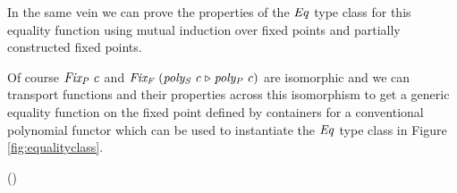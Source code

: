 In the same vein we can prove the properties of the \ensuremath{\Conid{Eq}} type class
for this equality function using mutual induction over fixed points
and partially constructed fixed points.

Of course \ensuremath{\Varid{Fix_{P}}\;\Varid{c}} and \ensuremath{\Varid{Fix_{F}}\;(\Varid{poly_{S}}\;\Varid{c}{\;\triangleright\;}\Varid{poly_{P}}\;\Varid{c})} are isomorphic and
we can transport functions and their properties across this
isomorphism to get a generic equality function on the fixed point
defined by containers for a conventional polynomial functor which can
be used to instantiate the \ensuremath{\Conid{Eq}} type class in Figure
\ref{fig:equalityclass}.
\begin{hscode}\SaveRestoreHook
{}%
%
%
\>[3]{}\;\;\Rightarrow {}\;(\;){}\<[E]%
\ColumnHook
\end{hscode}\resethooks

